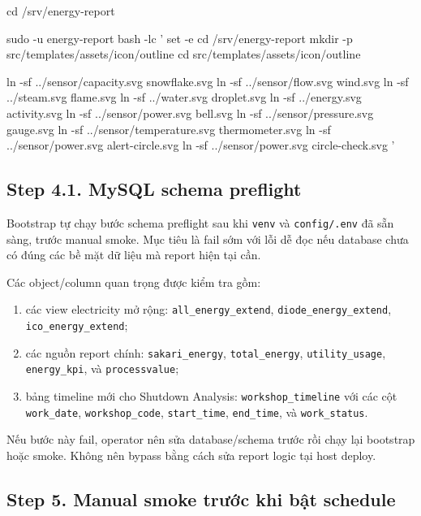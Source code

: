 \begin{ShellBlock}
cd /srv/energy-report

sudo -u energy-report bash -lc '
set -e
cd /srv/energy-report
mkdir -p src/templates/assets/icon/outline
cd src/templates/assets/icon/outline

ln -sf ../sensor/capacity.svg snowflake.svg
ln -sf ../sensor/flow.svg wind.svg
ln -sf ../steam.svg flame.svg
ln -sf ../water.svg droplet.svg
ln -sf ../energy.svg activity.svg
ln -sf ../sensor/power.svg bell.svg
ln -sf ../sensor/pressure.svg gauge.svg
ln -sf ../sensor/temperature.svg thermometer.svg
ln -sf ../sensor/power.svg alert-circle.svg
ln -sf ../sensor/power.svg circle-check.svg
'
\end{ShellBlock}

\subsection{Step 4.1. MySQL schema preflight}

Bootstrap tự chạy bước schema preflight sau khi \texttt{venv} và \texttt{config/.env} đã sẵn sàng, trước manual smoke. Mục tiêu là fail sớm với lỗi dễ đọc nếu database chưa có đúng các bề mặt dữ liệu mà report hiện tại cần.

Các object/column quan trọng được kiểm tra gồm:

\begin{enumerate}[label=-]
\item các view electricity mở rộng: \texttt{all\_energy\_extend}, \texttt{diode\_energy\_extend}, \texttt{ico\_energy\_extend};
\item các nguồn report chính: \texttt{sakari\_energy}, \texttt{total\_energy}, \texttt{utility\_usage}, \texttt{energy\_kpi}, và \texttt{processvalue};
\item bảng timeline mới cho Shutdown Analysis: \texttt{workshop\_timeline} với các cột \texttt{work\_date}, \texttt{workshop\_code}, \texttt{start\_time}, \texttt{end\_time}, và \texttt{work\_status}.
\end{enumerate}

Nếu bước này fail, operator nên sửa database/schema trước rồi chạy lại bootstrap hoặc smoke. Không nên bypass bằng cách sửa report logic tại host deploy.

\subsection{Step 5. Manual smoke trước khi bật schedule}

